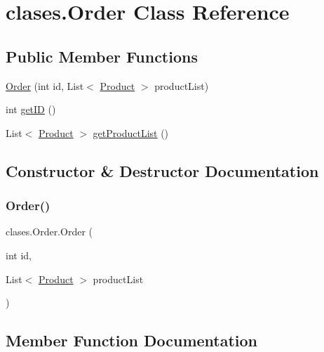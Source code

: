 \hypertarget{classclases_1_1_order}{}\section{clases.\+Order Class Reference}
\label{classclases_1_1_order}
\subsection*{Public Member Functions}
\begin{DoxyCompactItemize}
\item 
\mbox{\hyperlink{classclases_1_1_order_a5bf587036274a4563c208b61600614a9}{Order}} (int id, List$<$ \mbox{\hyperlink{classclases_1_1_product}{Product}} $>$ product\+List)
\item 
int \mbox{\hyperlink{classclases_1_1_order_a2e1d02601f162e07392865f4a3c1fca0}{get\+ID}} ()
\item 
List$<$ \mbox{\hyperlink{classclases_1_1_product}{Product}} $>$ \mbox{\hyperlink{classclases_1_1_order_aa9c192ec7bdf6b49ac0ab309f1581d97}{get\+Product\+List}} ()
\end{DoxyCompactItemize}


\subsection{Constructor \& Destructor Documentation}
\mbox{\label{classclases_1_1_order_a5bf587036274a4563c208b61600614a9}} 
\subsubsection{\texorpdfstring{Order()}{Order()}}
{\footnotesize\ttfamily clases.\+Order.\+Order (\begin{DoxyParamCaption}\item[{int}]{id,  }\item[{List$<$ \mbox{\hyperlink{classclases_1_1_product}{Product}} $>$}]{product\+List }\end{DoxyParamCaption})}



\subsection{Member Function Documentation}
\mbox{\label{classclases_1_1_order_a2e1d02601f162e07392865f4a3c1fca0}} 
